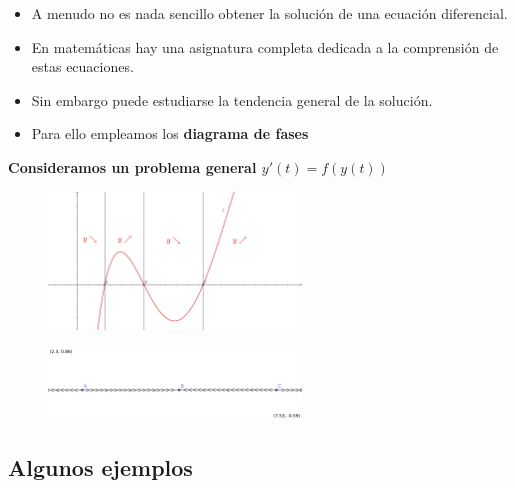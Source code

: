 \documentclass[8pt]{beamer}
\begin{document}
\begin{frame}
\begin{itemize}
\item A menudo no es nada sencillo obtener la solución de una ecuación diferencial.
\item En matemáticas hay una asignatura completa dedicada a la comprensión de estas ecuaciones.
\item Sin embargo puede estudiarse la tendencia general de la solución.
\item Para ello empleamos los \textbf{diagrama de fases}
\end{itemize}

\textbf{Consideramos un problema general $y'(t)=f(y(t))$}
\begin{figure}[hbtp]
\centering
\includegraphics[width = 0.6\textwidth]{img/propiedades-autonomas.png}
\end{figure}

\begin{figure}[hbtp]
\centering
\includegraphics[width = 0.6\textwidth]{img/diagrama-fases.png}
\end{figure}

\end{frame}
\subsection{Algunos ejemplos}
\end{document}
